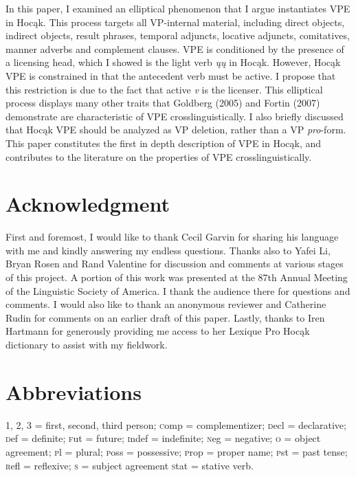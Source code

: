 \documentclass[output=paper]{LSP/langsci}
\begin{document}
In this paper, I examined an elliptical phenomenon that I argue instantiates VPE in Hoc\k{a}k. This process targets all VP-internal material, including direct objects, indirect objects, result phrases, temporal adjuncts, locative adjuncts, comitatives, manner adverbs and complement clauses. VPE is conditioned by the presence of a licensing head, which I showed is the light verb \emph{\k{u}\k{u}} in Hoc\k{a}k. However, Hoc\k{a}k VPE is constrained in that the antecedent verb must be active. I propose that this restriction is due to the fact that active \emph{v} is the licenser. This elliptical process displays many other traits that Goldberg (2005) and Fortin (2007) demonstrate are characteristic of VPE crosslinguistically. I also briefly discussed that Hoc\k{a}k VPE should be analyzed as VP deletion, rather than a VP \emph{pro}-form. This paper constitutes the first in depth description of VPE in Hoc\k{a}k, and contributes to the literature on the properties of VPE crosslinguistically. 

\section*{Acknowledgment}

First and foremost, I would like to thank Cecil Garvin for sharing his language with me and kindly answering my endless questions. Thanks also to Yafei Li, Bryan Rosen and Rand Valentine for discussion and comments at various stages of this project. A portion of this work was presented at the 87th Annual Meeting of the Linguistic Society of America. I thank the audience there for questions and comments. I would also like to thank an anonymous reviewer and Catherine Rudin for comments on an earlier draft of this paper. Lastly, thanks to Iren Hartmann for generously providing me access to her Lexique Pro Hoc\k{a}k dictionary to assist with my fieldwork.

\section*{Abbreviations}
1, 2, 3 = first, second, third person; {\textsc comp} = complementizer; {\textsc decl} = declarative; {\textsc def} = definite; {\textsc fut} = future; {\textsc indef} = indefinite; {\textsc neg} = negative; {\textsc o} = object agreement; {\textsc pl} = plural; {\textsc poss} = possessive; {\textsc prop} = proper name; {\textsc pst} = past tense; {\textsc refl} = reflexive; {\textsc s} = subject agreement {\textsc stat} = stative verb.
\end{document}
